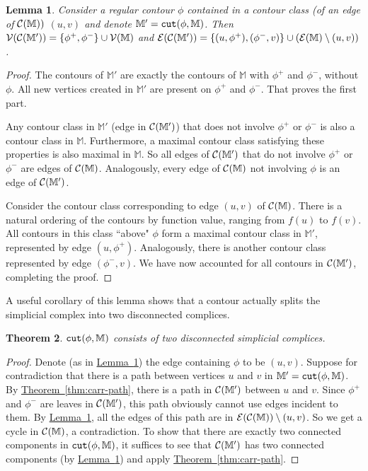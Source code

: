 \documentclass[11pt]{article}
\newtheorem{theorem}{Theorem}
\newtheorem{lemma}[theorem]{Lemma}
\theoremstyle{definition}
\newcommand{\cC}{{\cal C}}
\newcommand{\cE}{{\cal E}}
\newcommand{\cV}{{\cal V}}
\newcommand{\MM}{\mathbb{M}}
\newcommand{\Thm}[1]{\hyperref[thm:#1]{Theorem~\ref*{thm:#1}}} %
\newcommand{\Lem}[1]{\hyperref[lem:#1]{Lemma~\ref*{lem:#1}}} %
\newcommand{\cut}{{\tt cut}}
\newcommand{\reeb}{\cC}
\begin{document}
\begin{lemma} \label{lem:cut} Consider a regular contour $\phi$ contained in a contour class (of an edge of $\reeb(\MM))$
$(u,v)$ and denote $\MM' = \cut(\phi,\MM)$. Then $\cV(\reeb(\MM')) = \{\phi^+,\phi^-\} \cup \cV(\MM)$
and $\cE(\reeb(\MM')) = \{(u,\phi^+),(\phi^-,v)\} \cup (\cE(\MM) \setminus (u,v))$.
\end{lemma}

\begin{proof} The contours of $\MM'$ are exactly the contours of $\MM$ with $\phi^+$ and $\phi^-$, without $\phi$.
All new vertices created in $\MM'$ are present on $\phi^+$ and $\phi^-$. That proves the first part.

Any contour class in $\MM'$ (edge in $\cC(\MM')$) that does not involve $\phi^+$ or $\phi^-$ is also
a contour class in $\MM$. Furthermore, a maximal contour class satisfying these properties is also
maximal in $\MM$. So all edges of $\cC(\MM')$ that do not involve $\phi^+$ or $\phi^-$ are edges of $\cC(\MM)$.
Analogously, every edge of $\cC(\MM)$ not involving $\phi$ is an edge of $\cC(\MM')$.

Consider the contour class corresponding to edge $(u,v)$ of $\cC(\MM)$. There is a natural ordering
of the contours by function value, ranging from $f(u)$ to $f(v)$. All contours in this class ``above" $\phi$
form a maximal contour class in $\MM'$, represented by edge $(u,\phi^+)$. Analogously, there is another
contour class represented by edge $(\phi^-,v)$. We have now accounted for all contours in $\cC(\MM')$,
completing the proof.
\end{proof}

A useful corollary of this lemma shows that a contour actually splits the simplicial complex into
two disconnected complices.

\begin{theorem} \label{thm:jordan} $\cut(\phi,\MM)$ consists of two
disconnected simplicial complices.
\end{theorem}

\begin{proof} Denote (as in \Lem{cut}) the edge containing $\phi$ to be $(u,v)$. Suppose for contradiction that there is a path between vertices $u$ and $v$
in $\MM' = \cut(\phi,\MM)$. By \Thm{carr-path}, there is a path in $\cC(\MM')$ between $u$ and $v$. Since $\phi^+$ and $\phi^-$
are leaves in $\cC(\MM')$, this path obviously cannot use edges incident to them. By \Lem{cut},
all the edges of this path are in $\cE(\cC(\MM)) \setminus (u,v)$. So we get a cycle in $\cC(\MM)$, a contradiction.
To show that there are exactly two connected components in $\cut(\phi,\MM)$, it suffices
to see that $\cC(\MM')$ has two connected components (by \Lem{cut}) and apply \Thm{carr-path}.
\end{proof}
\end{document}
